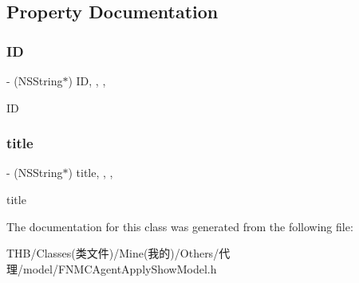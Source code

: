 \subsection{Property Documentation}
\mbox{\label{interface_f_n_agent_list_model_afcd1921a5d1ee3d5d11a4fe87b0cc084}} 
\subsubsection{\texorpdfstring{ID}{ID}}
{\footnotesize\ttfamily -\/ (N\+S\+String$\ast$) ID\hspace{0.3cm}{\ttfamily [read]}, {\ttfamily [write]}, {\ttfamily [nonatomic]}, {\ttfamily [copy]}}

ID \mbox{\label{interface_f_n_agent_list_model_a98a1f4261e4e38441a18075003ee4da8}} 
\subsubsection{\texorpdfstring{title}{title}}
{\footnotesize\ttfamily -\/ (N\+S\+String$\ast$) title\hspace{0.3cm}{\ttfamily [read]}, {\ttfamily [write]}, {\ttfamily [nonatomic]}, {\ttfamily [copy]}}

title 

The documentation for this class was generated from the following file\+:\begin{DoxyCompactItemize}
\item 
T\+H\+B/\+Classes(类文件)/\+Mine(我的)/\+Others/代理/model/F\+N\+M\+C\+Agent\+Apply\+Show\+Model.\+h\end{DoxyCompactItemize}
